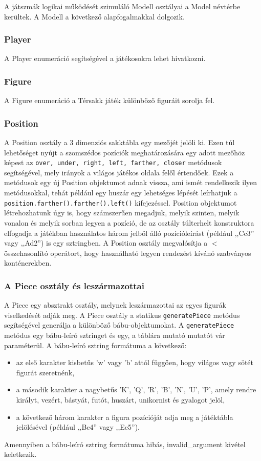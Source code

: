 \documentclass[12pt, twoside]{report}
\begin{document}
A játszmák logikai működését szimuláló Modell osztályai a Model névtérbe kerültek. A Modell a következő alapfogalmakkal dolgozik.

\subsubsection {Player}
A Player enumeráció segítségével a játékosokra lehet hivatkozni.

\subsubsection{Figure}
A Figure enumeráció a Térsakk játék különböző figuráit sorolja fel.

\subsubsection{Position}
A Position osztály a 3 dimenziós sakktábla egy mezőjét jelöli ki. Ezen túl lehetőséget nyújt a szomszédos pozíciók meghatározására egy adott mezőhöz képest az {\tt over, under, right, left, farther, closer} metódusok segítségével, mely irányok a világos játékos oldala felől értendőek. Ezek a metódusok egy új Position objektumot adnak vissza, ami ismét rendelkezik ilyen metódusokkal, tehát például egy huszár egy lehetséges lépését leírhatjuk a {\tt position.farther().farther().left()} kifejezéssel. Position objektumot létrehozhatunk úgy is, hogy számszerűen megadjuk, melyik szinten, melyik vonalon és melyik sorban legyen a pozíció, de az osztály túlterhelt konstruktora elfogadja a játékban használatos három jelből álló pozícióleírást (például ,,Cc3'' vagy ,,Ad2'') is egy sztringben. A Position osztály megvalósítja a $<$ összehasonlító operátort, hogy használható legyen rendezést kívánó szabványos konténerekben.

\subsubsection{A Piece osztály és leszármazottai}

A Piece egy absztrakt osztály, melynek leszármazottai  az egyes figurák viselkedését adják meg. A Piece osztály a statikus {\tt generatePiece} metódus segítségével generálja a különböző bábu-objektumokat. A {\tt generatePiece} metódus egy bábu-leíró sztringet és egy, a táblára mutató mutatót vár paraméterül. A bábu-leíró sztring formátuma a következő:
\begin{itemize}
	\item az első karakter kisbetűs 'w' vagy 'b' attól függően, hogy világos vagy sötét figurát szeretnénk,
	\item a második karakter a nagybetűs 'K', 'Q', 'R', 'B', 'N', 'U', 'P', amely rendre királyt, vezért, bástyát, futót, huszárt, unikornist és gyalogot jelöl,
	\item a következő három karakter a figura pozícióját adja meg a játéktábla jelölésével (például ,,Bc4'' vagy ,,Ee5'').
\end{itemize}
Amennyiben a bábu-leíró sztring formátuma hibás, invalid\_argument kivétel keletkezik.
\end{document}
